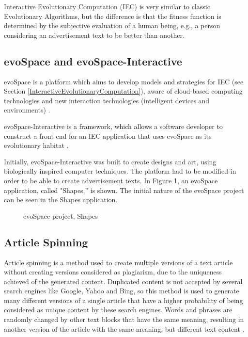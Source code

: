 \documentclass{acm_proc_article-sp}
\begin{document}
Interactive Evolutionary Computation (IEC) is very similar to classic
Evolutionary Algorithms, but the difference is that the fitness
function is determined by the subjective evaluation of a human being,
e.g., a person considering an advertisement text to be better than
another.

\subsection{evoSpace and evoSpace-Interactive}
\label{EvoSpace}

evoSpace is a platform which aims to develop models and strategies
for IEC (see Section \ref{InteractiveEvolutionaryComputation}), aware of cloud-based
computing technologies and new interaction technologies (intelligent
devices and environments) \cite{garcia2013evospace}.

evoSpace-Interactive is a framework, which allows a software developer
to construct a front end for an IEC application that uses evoSpace as
its evolutionary habitat \cite{garcia2013evospacei}.

Initially, evoSpace-Interactive was built to create designs and art, using
biologically inspired computer techniques. The platform had to be
modified in order to be able to create advertisement texts. In Figure
\ref{PicShapes}, an evoSpace application, called "Shapes,'' is
shown. The initial nature of the evoSpace project can be seen in the
Shapes application.

\begin{figure}
  \centering
  \caption{evoSpace project, Shapes}
  \label{PicShapes}
\end{figure}

\subsection{Article Spinning}

Article spinning is a method used to create multiple versions of a
text article without creating versions considered as plagiarism, due
to the uniqueness achieved of the generated content. Duplicated
content is not accepted by several search engines like Google, Yahoo
and Bing, so this method is used to generate many different versions
of a single article that have a higher probability of being considered
as unique content by these search engines. Words and phrases are
randomly changed by other text blocks that have the same meaning,
resulting in another version of the article with the same meaning, but
different text content \cite{malcolm2008approach}.
\end{document}
